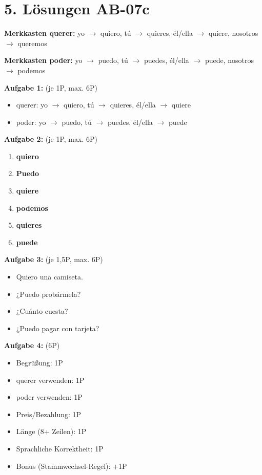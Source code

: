 \documentclass[11pt, a4paper]{article}
\newcommand{\lsg}[1]{\textcolor{loesung}{\textbf{#1}}}
\begin{document}

\section*{5. Lösungen AB-07c}

\textbf{Merkkasten querer:}
yo $\rightarrow$ quiero, tú $\rightarrow$ quieres, él/ella $\rightarrow$ quiere, nosotros $\rightarrow$ queremos

\textbf{Merkkasten poder:}
yo $\rightarrow$ puedo, tú $\rightarrow$ puedes, él/ella $\rightarrow$ puede, nosotros $\rightarrow$ podemos

\vspace{0.5em}

\textbf{Aufgabe 1:} (je 1P, max. 6P)
\begin{itemize}
    \item querer: yo $\rightarrow$ quiero, tú $\rightarrow$ quieres, él/ella $\rightarrow$ quiere
    \item poder: yo $\rightarrow$ puedo, tú $\rightarrow$ puedes, él/ella $\rightarrow$ puede
\end{itemize}

\textbf{Aufgabe 2:} (je 1P, max. 6P)
\begin{enumerate}[label=\alph*)]
    \item \lsg{quiero}
    \item \lsg{Puedo}
    \item \lsg{quiere}
    \item \lsg{podemos}
    \item \lsg{quieres}
    \item \lsg{puede}
\end{enumerate}

\textbf{Aufgabe 3:} (je 1,5P, max. 6P)
\begin{itemize}
    \item Quiero una camiseta.
    \item ¿Puedo probármela?
    \item ¿Cuánto cuesta?
    \item ¿Puedo pagar con tarjeta?
\end{itemize}

\textbf{Aufgabe 4:} (6P)
\begin{itemize}
    \item Begrüßung: 1P
    \item querer verwenden: 1P
    \item poder verwenden: 1P
    \item Preis/Bezahlung: 1P
    \item Länge (8+ Zeilen): 1P
    \item Sprachliche Korrektheit: 1P
    \item Bonus (Stammwechsel-Regel): +1P
\end{itemize}
\end{document}
